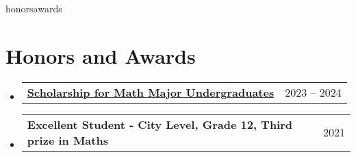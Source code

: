 \documentclass[letterpaper,11pt]{article}
\makeatletter
\newcommand{\subheading}[2]{
    \normalsize
    \begin{tabular*}{0.97\textwidth}[t]{l@{\extracolsep{\fill}}r}
      \textbf{#1} & #2 \\
    \end{tabular*}
    \vspace{-2pt}
}
\makeatother
\begin{document}
\begin{filecontents*}[overwrite]{honorsawards}
    \section{Honors and Awards}
    \begin{itemize}
        \item \subheading{\href{https://viasm.edu.vn/hoat-dong-khoa-hoc/tin-tuc/chi-tiet/hoc-bong-chuong-trinh-toan-nam-hoc-2023-2024}{\small Scholarship for Math Major Undergraduates \faExternalLink}}{2023 -- 2024}
        
        \item \subheading{\small Excellent Student - City Level, Grade 12, Third prize in Maths}{2021}
    \end{itemize}
\end{filecontents*}
\end{document}
